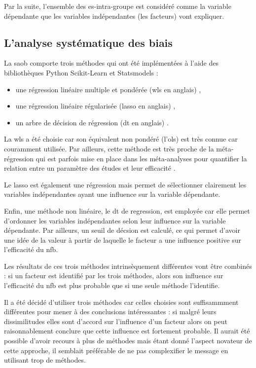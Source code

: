 Par la suite, l'ensemble des \gls{es}-intra-groupe est considéré comme la variable dépendante que les variables indépendantes (les facteurs) vont expliquer. 

\subsection{L'analyse systématique des biais} \label{saob_method}

La \gls{saob} comporte trois méthodes qui ont été implémentées à l'aide des bibliothèques Python Scikit-Learn \citep[version 0.18.1]{Pedregosa2011} et Statsmodels \citep[version 0.8.0]{Seabold2010} : 
\begin{itemize}
    \item une régression linéaire multiple et pondérée (\gls{wls} en anglais) \citep{Montgomery2012},
	  \item une régression linéaire régularisée (\gls{lasso} en anglais) \citep{Tibshirani1996},
	  \item un arbre de décision de régression (\gls{dt} en anglais) \citep{Quinlan1986}.
\end{itemize}

La \gls{wls} a été choisie car son équivalent non pondéré (l'\gls{ols}) est très connue car couramment utilisée. Par ailleurs, cette méthode est très proche de la méta-régression qui est 
parfois mise en place dans les méta-analyses pour quantifier la relation entre un paramètre des études et leur efficacité \citep{Cortese2016, Borenstein2009}. 

Le \gls{lasso} est également une régression mais permet de sélectionner clairement les variables indépendantes ayant une influence sur la variable dépendante. 

Enfin, une méthode non linéaire, le \gls{dt} de regression, est employée car elle permet d'ordonner les variables indépendantes selon leur influence sur la variable dépendante. 
Par ailleurs, un seuil de décsion est calculé, ce qui permet d'avoir une idée de la valeur à partir de laquelle le facteur a une influence positive sur l'efficacité du \gls{nfb}.

Les résultats de ces trois méthodes intrinsèquement différentes vont être combinés : si un facteur est identifié par les trois méthodes, alors son influence sur l'efficacité du 
\gls{nfb} est plus probable que si une seule méthode l'identifie. 

Il a été décidé d'utiliser trois méthodes car celles choisies sont suffisammment différentes pour mener à des conclusions intéressantes : si malgré leurs dissimilitudes 
elles sont d'accord sur l'influence d'un facteur alors on peut raisonnablement conclure que cette influence est fortement probable. Il aurait été possible
d'avoir recours à plus de méthodes mais étant donné l'aspect novateur de cette approche, il semblait préférable de ne pas complexifier le message en utilisant trop de méthodes.

